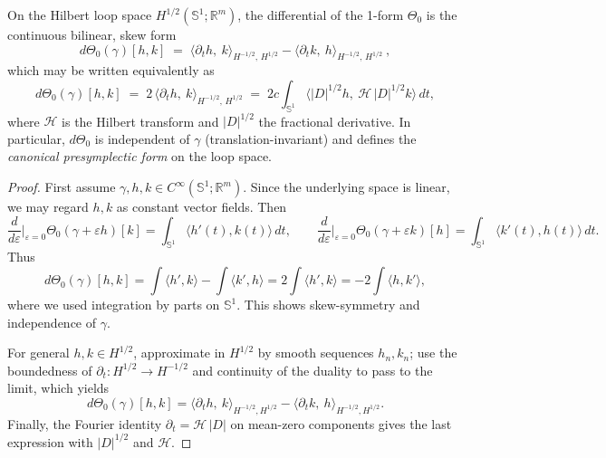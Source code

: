 \documentclass[10pt,a4paper]{amsart}
\begin{document}
\begin{theorem}\label{th:presymp-Hhalf}
On the Hilbert loop space $H^{1/2}(\mathbb S^1;\mathbb R^m)$,
the differential of the 1-form $\Theta_0$ is the continuous bilinear, skew form
\[
\boxed{\ d\Theta_0(\gamma)[h,k]\;=\;
\langle \partial_t h,\ k\rangle_{H^{-1/2},\,H^{1/2}}
-\langle \partial_t k,\ h\rangle_{H^{-1/2},\,H^{1/2}}\ ,\ }
\]
which may be written equivalently as
\[
d\Theta_0(\gamma)[h,k]\;=\;2\,\langle \partial_t h,\ k\rangle_{H^{-1/2},\,H^{1/2}}
\;=\;2c\int_{\mathbb S^1}\!\langle |D|^{1/2}h,\ \mathcal H\,|D|^{1/2}k\rangle\,dt,
\]
where $\mathcal H$ is the Hilbert transform and $|D|^{1/2}$ the fractional derivative.
In particular, $d\Theta_0$ is independent of $\gamma$ (translation-invariant) and defines
the \emph{canonical presymplectic form} on the loop space.
\end{theorem}

\begin{proof}
First assume $\gamma,h,k\in C^\infty(\mathbb S^1;\mathbb R^m)$.
Since the underlying space is linear, we may regard $h,k$ as constant vector fields.
Then
\[
\frac{d}{d\varepsilon}\Big|_{\varepsilon=0}\Theta_0(\gamma+\varepsilon h)[k]
=\int_{\mathbb S^1}\!\langle h'(t),k(t)\rangle\,dt,\qquad
\frac{d}{d\varepsilon}\Big|_{\varepsilon=0}\Theta_0(\gamma+\varepsilon k)[h]
=\int_{\mathbb S^1}\!\langle k'(t),h(t)\rangle\,dt.
\]
Thus
\[
d\Theta_0(\gamma)[h,k]
=\int\langle h',k\rangle-\int\langle k',h\rangle
=2\int\langle h',k\rangle
=-2\int\langle h,k'\rangle,
\]
where we used integration by parts on $\mathbb S^1$.
This shows skew-symmetry and independence of $\gamma$.

For general $h,k\in H^{1/2}$, approximate in $H^{1/2}$ by smooth sequences
$h_n,k_n$; use the boundedness of $\partial_t:H^{1/2}\to H^{-1/2}$ and continuity of the
duality to pass to the limit, which yields
\[
d\Theta_0(\gamma)[h,k]
=\langle \partial_t h,\ k\rangle_{H^{-1/2},H^{1/2}}
-\langle \partial_t k,\ h\rangle_{H^{-1/2},H^{1/2}}.
\]
Finally, the Fourier identity $\partial_t=\mathcal H\,|D|$ on mean-zero components
gives the last expression with $|D|^{1/2}$ and $\mathcal H$.
\end{proof}
\end{document}

